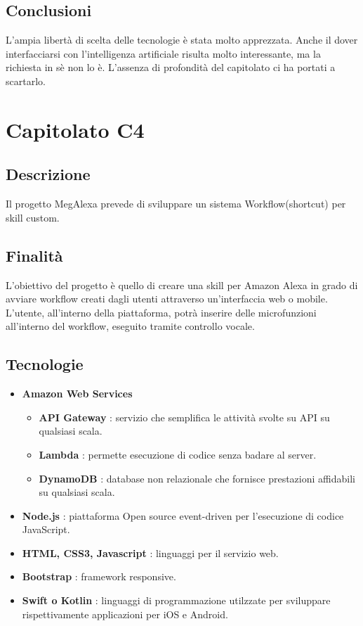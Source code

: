\documentclass{article}
\begin{document}
			\subsection{Conclusioni}
                L'ampia libertà di scelta delle tecnologie è stata molto apprezzata. Anche il dover interfacciarsi con l'intelligenza artificiale risulta molto interessante, ma la richiesta in sè non lo è. L'assenza di profondità del capitolato ci ha portati a scartarlo.
\newpage
    \section{Capitolato C4}
        \subsection{Descrizione}
            Il progetto MegAlexa prevede di sviluppare un sistema Workflow(shortcut) per skill custom.
        \subsection{Finalità}
            L'obiettivo del progetto è quello di creare una skill per Amazon Alexa in grado di avviare workflow creati dagli utenti attraverso un'interfaccia web o mobile.
			L'utente, all'interno della piattaforma, potrà inserire delle microfunzioni all'interno del workflow, eseguito tramite controllo vocale.
        \subsection{Tecnologie}
            \begin{itemize}
                \item \textbf{Amazon Web Services}
                    \begin{itemize}
                        \item \textbf{API Gateway} : servizio che semplifica le attività svolte su API su qualsiasi scala.
                        \item \textbf{Lambda} : permette esecuzione di codice senza badare al server.
                        \item \textbf{DynamoDB} : database non relazionale che fornisce prestazioni affidabili su qualsiasi scala.
                    \end{itemize}
                    \item \textbf{Node.js} : piattaforma Open source event-driven per l'esecuzione di codice JavaScript.
                    \item \textbf{HTML, CSS3, Javascript} : linguaggi per il servizio web.
                    \item \textbf{Bootstrap} : framework responsive.
                    \item \textbf{Swift o Kotlin} : linguaggi di programmazione utilzzate per sviluppare rispettivamente applicazioni per iOS e Android.
            \end{itemize}
\end{document}
